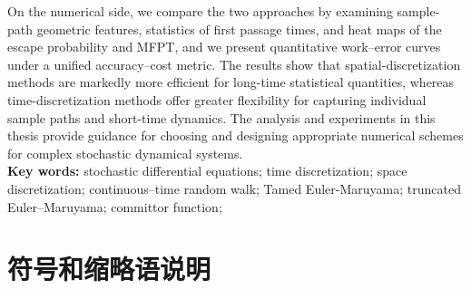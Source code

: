 	On the numerical side, we compare the two approaches by examining sample-path geometric features, statistics of first passage times, and heat maps of the escape probability and MFPT, and we present quantitative work--error curves under a unified accuracy–cost metric. The results show that spatial-discretization methods are markedly more efficient for long-time statistical quantities, whereas time-discretization methods offer greater flexibility for capturing individual sample paths and short-time dynamics. The analysis and experiments in this thesis provide guidance for choosing and designing appropriate numerical schemes for complex stochastic dynamical systems.
	\\   %
	
	{\bf\large Key words:}  stochastic differential equations; time discretization; space discretization; continuous–time random walk; Tamed Euler-Maruyama; truncated Euler–Maruyama; committor function; 
	\newpage
	\tableofcontents  %
	
	\newpage
	\listoffigures   %
	
	\newpage
	\listoftables   %
	
	
	\newpage
	\section*{符号和缩略语说明}
	
